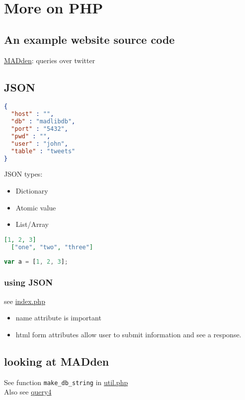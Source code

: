 \documentclass[12pt]{article}
\begin{document}
\section{More on PHP}
\subsection{An example website source code}
\href{https://github.com/cegme/MADden}{MADden}: queries over twitter
\subsection{JSON}
\begin{lstlisting}[language=json,caption=JSON example]
{
  "host" : "",
  "db" : "madlibdb",
  "port" : "5432",
  "pwd" : "",
  "user" : "john",
  "table" : "tweets"
}
\end{lstlisting}
JSON types:
\begin{itemize}
  \item {Dictionary}
  \item {Atomic value}
  \item {List/Array}
\end{itemize}
\begin{lstlisting}[language=json,caption=arrays in JSON]
  [1, 2, 3]
  ["one", "two", "three"]
\end{lstlisting}
\begin{lstlisting}[language=javascript,caption=using JSON arrays in javascript]
  var a = [1, 2, 3];
\end{lstlisting}

\subsubsection{using JSON}
see
\href{https://github.com/cegme/MADden/blob/master/web/index.php}{index.php}\\
\begin{itemize}
  \item {name attribute is important}
  \item {
      html form attributes allow user to submit information and see a response.
    }
\end{itemize}

\subsection{looking at MADden}
See function \lstinline{make_db_string} in
\href{https://github.com/cegme/MADden/blob/master/web/util.php}{util.php}\\
Also see
\href{https://github.com/cegme/MADden/blob/master/web/query4.php}{query4}
\end{document}
